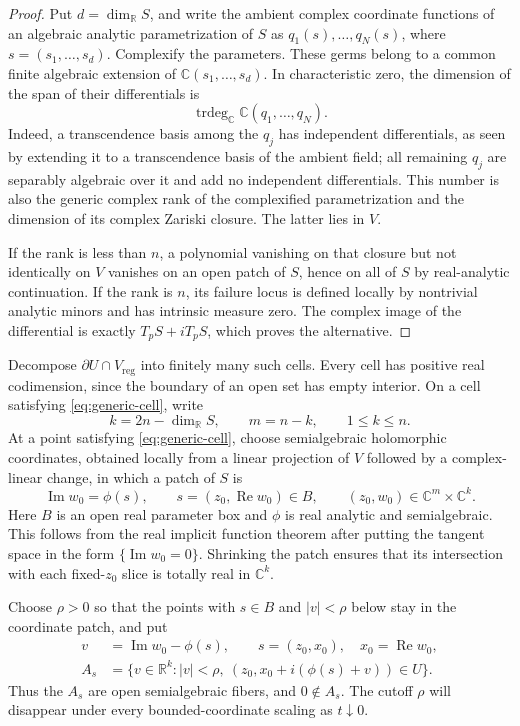 \begin{proof}
Put $d=\dim_{\mathbb{R}}S$, and write the ambient complex coordinate functions of an algebraic analytic parametrization of $S$ as $q_1(s),\ldots,q_N(s)$, where $s=(s_1,\ldots,s_d)$.  Complexify the parameters.  These germs belong to a common finite algebraic extension of $\mathbb{C}(s_1,\ldots,s_d)$.  In characteristic zero, the dimension of the span of their differentials is
\[
 \operatorname{trdeg}_{\mathbb{C}}\mathbb{C}(q_1,\ldots,q_N).
\]
Indeed, a transcendence basis among the $q_j$ has independent differentials, as seen by extending it to a transcendence basis of the ambient field; all remaining $q_j$ are separably algebraic over it and add no independent differentials.  This number is also the generic complex rank of the complexified parametrization and the dimension of its complex Zariski closure.  The latter lies in $V$.

If the rank is less than $n$, a polynomial vanishing on that closure but not identically on $V$ vanishes on an open patch of $S$, hence on all of $S$ by real-analytic continuation.  If the rank is $n$, its failure locus is defined locally by nontrivial analytic minors and has intrinsic measure zero.  The complex image of the differential is exactly $T_pS+iT_pS$, which proves the alternative.
\end{proof}

Decompose $\partial U\cap V_{\mathrm{reg}}$ into finitely many such cells.  Every cell has positive real codimension, since the boundary of an open set has empty interior.  On a cell satisfying \eqref{eq:generic-cell}, write
\[
 k=2n-\dim_{\mathbb{R}}S,\qquad m=n-k,
 \qquad 1\leq k\leq n.
\]
At a point satisfying \eqref{eq:generic-cell}, choose semialgebraic holomorphic coordinates, obtained locally from a linear projection of $V$ followed by a complex-linear change, in which a patch of $S$ is
\begin{equation}
 \operatorname{Im}w_0=\phi(s),\qquad
 s=(z_0,\operatorname{Re}w_0)\in B,
 \qquad (z_0,w_0)\in\mathbb{C}^m\times\mathbb{C}^k.
 \label{eq:boundary-graph}
\end{equation}
Here $B$ is an open real parameter box and $\phi$ is real analytic and semialgebraic.  This follows from the real implicit function theorem after putting the tangent space in the form $\{\operatorname{Im}w_0=0\}$.  Shrinking the patch ensures that its intersection with each fixed-$z_0$ slice is totally real in $\mathbb{C}^k$.

Choose $\rho>0$ so that the points with $s\in B$ and $|v|<\rho$ below stay in the coordinate patch, and put
\begin{equation}
 \begin{split}
 v&=\operatorname{Im}w_0-\phi(s),\qquad
 s=(z_0,x_0),\quad x_0=\operatorname{Re}w_0,\\
 A_s&=\{v\in\mathbb{R}^k:|v|<\rho,\
       (z_0,x_0+i(\phi(s)+v))\in U\}.
 \end{split}
 \label{eq:offset-fibers}
\end{equation}
Thus the $A_s$ are open semialgebraic fibers, and $0\notin A_s$. The cutoff $\rho$ will disappear under every bounded-coordinate scaling as $t\downarrow0$.

